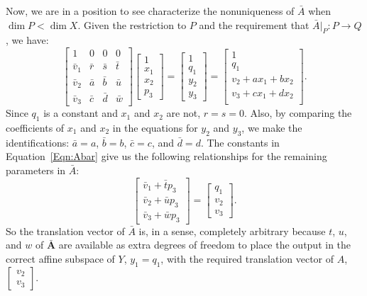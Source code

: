 \documentclass[11pt]{article}
\begin{document}
Now, we are in a position to see characterize the nonuniqueness of
$\bar{A}$ when $\dim P < \dim X$.  Given the restriction to $P$ and
the requirement that $\bar{A}|_P: P \rightarrow Q$, we have:
\begin{equation}\label{Eqn:Abar}
  \left[
    \begin{matrix}
           1     & 0 & 0 & 0 \\
      \bar{v}_1  & \bar{r} & \bar{s} & \bar{t} \\
      \bar{v}_2  & \bar{a} & \bar{b} & \bar{u} \\
      \bar{v}_3  & \bar{c} & \bar{d} & \bar{w} 
    \end{matrix}
  \right]
  \left[
    \begin{matrix}
      1\\x_1\\x_2\\p_3
    \end{matrix}
  \right] = 
  \left[
    \begin{matrix}
      1\\q_1\\y_2\\y_3
    \end{matrix}
  \right] =
    \left[
      \begin{matrix}
        1\\ q_1 \\
      v_2 + ax_1 + bx_2 \\
      v_3 + cx_1 + dx_2 \\
    \end{matrix} \right].
\end{equation}
Since $q_1$ is a constant and $x_1$ and $x_2$ are not, $r = s = 0$.
Also, by comparing the coefficients of $x_1$ and $x_2$ in the
equations for $y_2$ and $y_3$, we make the identifications: $\bar{a} =
a$, $\bar{b} = b$, $\bar{c} = c$, and $\bar{d} = d$.  The constants in
Equation~\ref{Eqn:Abar} give us the following relationships for the
remaining parameters in $\bar{A}$:
\begin{equation}
  \left[
    \begin{matrix}
      \bar{v}_1 + \bar{t} p_3 \\
      \bar{v}_2 + \bar{u} p_3 \\
      \bar{v}_3 + \bar{w} p_3     
    \end{matrix}
    \right] = \left[
    \begin{matrix}
      q_1 \\
      v_2 \\
      v_3  
    \end{matrix}
    \right].
\end{equation}
So the translation vector of $\bar{A}$ is, in a sense, completely
arbitrary because $t$, $u$, and $w$ of $\mathbf{\bar{A}}$ are
available as extra degrees of freedom to place the output in the
correct affine subspace of $Y$, $y_1 = q_1$, with the required
translation vector of $A$, $\left[\begin{matrix}v_2\\v_3\end{matrix}\right]$.
\end{document}
